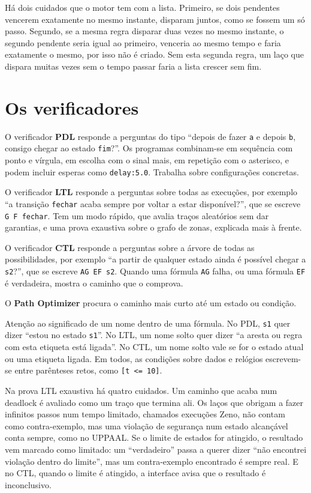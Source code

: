 \documentclass[11pt,a4paper]{article}
\newcommand{\code}[1]{\texttt{#1}}
\begin{document}
Há dois cuidados que o motor tem com a lista. Primeiro, se dois pendentes vencerem exatamente no mesmo instante, disparam juntos, como se fossem um só passo. Segundo, se a mesma regra disparar duas vezes no mesmo instante, o segundo pendente seria igual ao primeiro, venceria ao mesmo tempo e faria exatamente o mesmo, por isso não é criado. Sem esta segunda regra, um laço que dispara muitas vezes sem o tempo passar faria a lista crescer sem fim.

\section{Os verificadores}

O verificador \textbf{PDL} responde a perguntas do tipo ``depois de fazer \code{a} e depois \code{b}, consigo chegar ao estado \code{fim}?''. Os programas combinam-se em sequência com ponto e vírgula, em escolha com o sinal mais, em repetição com o asterisco, e podem incluir esperas como \code{delay:5.0}. Trabalha sobre configurações concretas.

O verificador \textbf{LTL} responde a perguntas sobre todas as execuções, por exemplo ``a transição \code{fechar} acaba sempre por voltar a estar disponível?'', que se escreve \code{G F fechar}. Tem um modo rápido, que avalia traços aleatórios sem dar garantias, e uma prova exaustiva sobre o grafo de zonas, explicada mais à frente.

O verificador \textbf{CTL} responde a perguntas sobre a árvore de todas as possibilidades, por exemplo ``a partir de qualquer estado ainda é possível chegar a \code{s2}?'', que se escreve \code{AG EF s2}. Quando uma fórmula \code{AG} falha, ou uma fórmula \code{EF} é verdadeira, mostra o caminho que o comprova.

O \textbf{Path Optimizer} procura o caminho mais curto até um estado ou condição.

Atenção ao significado de um nome dentro de uma fórmula. No PDL, \code{s1} quer dizer ``estou no estado \code{s1}''. No LTL, um nome solto quer dizer ``a aresta ou regra com esta etiqueta está ligada''. No CTL, um nome solto vale se for o estado atual ou uma etiqueta ligada. Em todos, as condições sobre dados e relógios escrevem-se entre parênteses retos, como \code{[t <= 10]}.

Na prova LTL exaustiva há quatro cuidados. Um caminho que acaba num deadlock é avaliado como um traço que termina ali. Os laços que obrigam a fazer infinitos passos num tempo limitado, chamados execuções Zeno, não contam como contra-exemplo, mas uma violação de segurança num estado alcançável conta sempre, como no UPPAAL. Se o limite de estados for atingido, o resultado vem marcado como limitado: um ``verdadeiro'' passa a querer dizer ``não encontrei violação dentro do limite'', mas um contra-exemplo encontrado é sempre real. E no CTL, quando o limite é atingido, a interface avisa que o resultado é inconclusivo.
\end{document}
